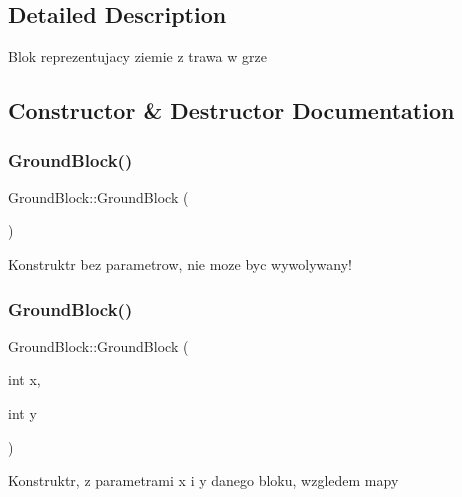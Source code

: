 \subsection{Detailed Description}
Blok reprezentujacy ziemie z trawa w grze 

\subsection{Constructor \& Destructor Documentation}
\mbox{\label{class_ground_block_adb573a253a45cd9ee4d2c2b51dadcd87}} 
\subsubsection{\texorpdfstring{Ground\+Block()}{GroundBlock()}\hspace{0.1cm}{\footnotesize\ttfamily [1/2]}}
{\footnotesize\ttfamily Ground\+Block\+::\+Ground\+Block (\begin{DoxyParamCaption}{ }\end{DoxyParamCaption})}

Konstruktr bez parametrow, nie moze byc wywolywany! \mbox{\label{class_ground_block_a0155a6938214c2752002828b9e26da0a}} 
\subsubsection{\texorpdfstring{Ground\+Block()}{GroundBlock()}\hspace{0.1cm}{\footnotesize\ttfamily [2/2]}}
{\footnotesize\ttfamily Ground\+Block\+::\+Ground\+Block (\begin{DoxyParamCaption}\item[{int}]{x,  }\item[{int}]{y }\end{DoxyParamCaption})}

Konstruktr, z parametrami x i y danego bloku, wzgledem mapy \mbox{\label{class_ground_block_a2f81acbda3a2b1c4a901a59de60124d0}} 
